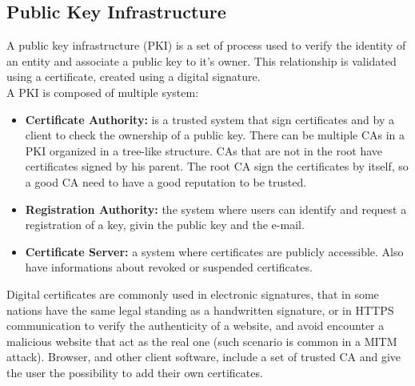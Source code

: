 \subsection{Public Key Infrastructure}
A public key infrastructure (PKI) is a set of process used to verify the identity of an entity and associate a public key to it's owner. This relationship is validated using a certificate, created using a digital signature.\\
A PKI is composed of multiple system:
\begin{itemize}
    \item{\textbf{Certificate Authority:} is a trusted system that sign certificates and by a client to check the ownership of a public key. There can be multiple CAs in a PKI organized in a tree-like structure. CAs that are not in the root have certificates signed by his parent. The root CA sign the certificates by itself, so a good CA need to have a good reputation to be trusted.}
    \item{\textbf{Registration Authority:} the system where users can identify and request a registration of a key, givin the public key and the e-mail.}
    \item{\textbf{Certificate Server:} a system where certificates are publicly accessible. Also have informations about revoked or suspended certificates.}
\end{itemize}
Digital certificates are commonly used in electronic signatures, that in some nations have the same legal standing as a handwritten signature, or in HTTPS communication to verify the authenticity of a website, and avoid encounter a malicious website that act as the real one (such scenario is common in a MITM attack). Browser, and other client software, include a set of trusted CA and give the user the possibility to add their own certificates.
